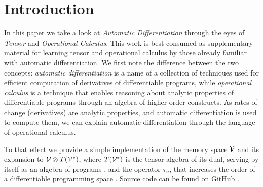 \section{Introduction}\label{sec:introduction}

In this paper we take a look at \emph{Automatic Differentiation} through the eyes of \emph{Tensor} and \emph{Operational Calculus}. This work is best consumed as supplementary material for learning tensor and operational calculus by those already familiar with automatic differentiation. We first note the difference between the two concepts: \emph{automatic differentiation} is a name of a collection of techniques used for efficient computation of derivatives of differentiable programs, while \emph{operational calculus} is a technique that enables reasoning about analytic properties of differentiable programs through an algebra of higher order constructs. As rates of change (derivatives) are analytic properties, and automatic differentiation is used to compute them, we can explain automatic differentiation through the language of operational calculus.


To that effect we provide a simple implementation of the memory space $\mathcal{V}$ and its expansion to $\mathcal{V}\otimes T(\mathcal{V}^*)$, where $T(\mathcal{V}^*)$ is the tensor algebra of its dual, serving by itself as an algebra of programs \cite[Definition~4.1]{OperationalCalculus}, and the operator $\tau_n$, that increases the order of a differentiable programming space \cite[Proposition~5.1]{OperationalCalculus}.
Source code can be found on GitHub \cite{dCpp}.





